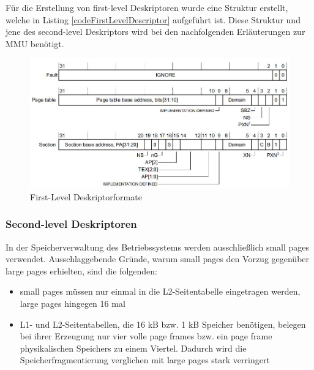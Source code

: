 Für die Erstellung von first-level Deskriptoren wurde eine Struktur erstellt, welche in Listing \ref{codeFirstLevelDescriptor} aufgeführt ist. Diese Struktur und jene des second-level Deskriptors wird bei den nachfolgenden Erläuterungen zur MMU benötigt.\\

\begin{figure}[H]
	\includegraphics[scale=0.7]{chapters/mmu/figures/firstLevelDescriptor}
	\caption{First-Level Deskriptorformate \cite[S. B3-1326]{ARM:ARM}}
	\label{fig:firstLevelDescriptor}
\end{figure}




\subsubsection*{Second-level Deskriptoren}

In der Speicherverwaltung des Betriebssystems werden ausschließlich small pages verwendet. Ausschlaggebende Gründe, warum small pages den Vorzug gegenüber large pages erhielten, sind die folgenden:

\begin{itemize}
	\item small pages müssen nur einmal in die L2-Seitentabelle eingetragen werden, large pages hingegen 16 mal
	\item L1- und L2-Seitentabellen, die 16 kB bzw. 1 kB Speicher benötigen, belegen bei ihrer Erzeugung nur vier volle page frames bzw. ein page frame physikalischen Speichers zu einem Viertel. Dadurch wird die Speicherfragmentierung verglichen mit large pages stark verringert
\end{itemize}

